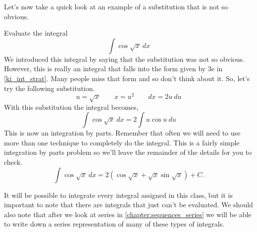 Let's now take a quick look at an example of a substitution that is not so obvious.

\begin{example}\label{ex_int_strat_cos_sqrt}
Evaluate the integral
\[\int \cos \sqrt x\ dx\]
\solution
We introduced this integral by saying that the substitution was not so obvious. However, this is really an integral that falls into the form given by 3e in \autoref{ki_int_strat}. Many people miss that form and so don't think about it. So, let's try the following substitution.
\[u = \sqrt x \qquad x=u^2 \qquad dx=2u\ du\]
With this substitution the integral becomes,
\[\int \cos \sqrt x\ dx = 2\int u \cos u\ du\]
This is now an integration by parts. Remember that often we will need to use more than one technique to completely do the integral. This is a fairly simple integration by parts problem so we'll leave the remainder of the details for you to check.
\[\int \cos \sqrt x\ dx =2(\cos \sqrt x + \sqrt x \sin \sqrt x) + C.\]
\end{example}

\bigskip
It will be possible to integrate every integral assigned in this class, but it is important to note that there are integrals that just can't be evaluated. We should also note that after we look at series in \autoref{chapter:sequences_series} we will be able to write down a series representation of many of these types of integrals.


